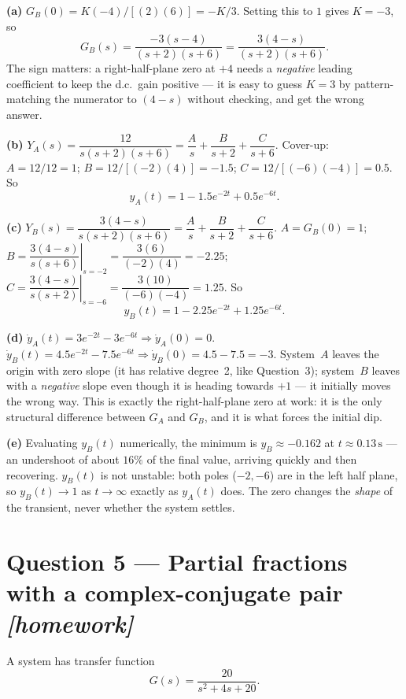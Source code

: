 \documentclass[11pt,a4paper]{article}
\newcommand{\athome}{\hfill{\small\color{fflag}\itshape[homework]}}
\begin{document}
\begin{solution}
\textbf{(a)} $G_B(0)=K(-4)/[(2)(6)]=-K/3$. Setting this to $1$ gives
$K=-3$, so
\[
  G_B(s)=\frac{-3(s-4)}{(s+2)(s+6)}=\frac{3(4-s)}{(s+2)(s+6)}.
\]
The sign matters: a right-half-plane zero at $+4$ needs a \emph{negative}
leading coefficient to keep the d.c.\ gain positive --- it is easy to guess
$K=3$ by pattern-matching the numerator to $(4-s)$ without checking, and get
the wrong answer.

\medskip
\textbf{(b)} $Y_A(s)=\dfrac{12}{s(s+2)(s+6)}=\dfrac{A}{s}+\dfrac{B}{s+2}+\dfrac{C}{s+6}$.
Cover-up: $A=12/12=1$; $B=12/[(-2)(4)]=-1.5$; $C=12/[(-6)(-4)]=0.5$. So
\[
  y_A(t)=1-1.5e^{-2t}+0.5e^{-6t}.
\]

\medskip
\textbf{(c)} $Y_B(s)=\dfrac{3(4-s)}{s(s+2)(s+6)}=\dfrac{A}{s}+\dfrac{B}{s+2}+\dfrac{C}{s+6}$.
$A=G_B(0)=1$; $B=\left.\dfrac{3(4-s)}{s(s+6)}\right|_{s=-2}=\dfrac{3(6)}{(-2)(4)}=-2.25$;
$C=\left.\dfrac{3(4-s)}{s(s+2)}\right|_{s=-6}=\dfrac{3(10)}{(-6)(-4)}=1.25$. So
\[
  y_B(t)=1-2.25e^{-2t}+1.25e^{-6t}.
\]

\medskip
\textbf{(d)} $\dot y_A(t)=3e^{-2t}-3e^{-6t}\Rightarrow\dot y_A(0)=0$.
$\dot y_B(t)=4.5e^{-2t}-7.5e^{-6t}\Rightarrow\dot y_B(0)=4.5-7.5=-3$.
System~$A$ leaves the origin with zero slope (it has relative degree~2, like
Question~3); system~$B$ leaves with a \emph{negative} slope even though it
is heading towards $+1$ --- it initially moves the wrong way. This is exactly
the right-half-plane zero at work: it is the only structural difference
between $G_A$ and $G_B$, and it is what forces the initial dip.

\medskip
\textbf{(e)} Evaluating $y_B(t)$ numerically, the minimum is
$y_B\approx-0.162$ at $t\approx0.13\,\si{\second}$ --- an undershoot of about
$16\%$ of the final value, arriving quickly and then recovering. $y_B(t)$
is not unstable: both poles ($-2,-6$) are in the left half plane, so
$y_B(t)\to1$ as $t\to\infty$ exactly as $y_A(t)$ does. The zero changes the
\emph{shape} of the transient, never whether the system settles.
\end{solution}

\section*{Question 5 --- Partial fractions with a complex-conjugate pair \athome}

A system has transfer function
\[
  G(s)=\frac{20}{s^2+4s+20}.
\]
\end{document}
